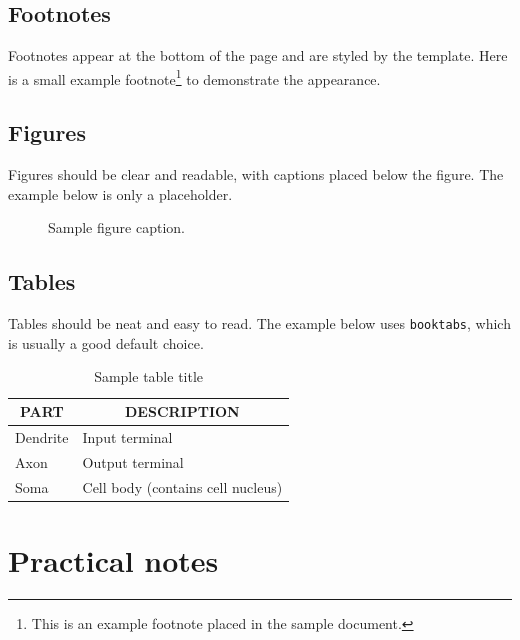 \documentclass{article} %
\begin{document}
\subsection{Footnotes}

Footnotes appear at the bottom of the page and are styled by the template.
Here is a small example footnote\footnote{This is an example footnote placed in
the sample document.} to demonstrate the appearance.

\subsection{Figures}

Figures should be clear and readable, with captions placed below the figure.
The example below is only a placeholder.

\begin{figure}[t]
\begin{center}
\fbox{\rule[-.5cm]{0cm}{4cm} \rule[-.5cm]{4cm}{0cm}}
\end{center}
\caption{Sample figure caption.}
\end{figure}

\subsection{Tables}

Tables should be neat and easy to read. The example below uses
\texttt{booktabs}, which is usually a good default choice.

\begin{table}[t]
\begin{center}
\begin{tabular}{ll}
\toprule
\multicolumn{1}{c}{\bf PART}  &\multicolumn{1}{c}{\bf DESCRIPTION} \\
\midrule
Dendrite         & Input terminal \\
Axon             & Output terminal \\
Soma             & Cell body (contains cell nucleus) \\
\bottomrule
\end{tabular}
\end{center}
\caption{Sample table title}\label{sample-table}
\end{table}

\section{Practical notes}
\end{document}

